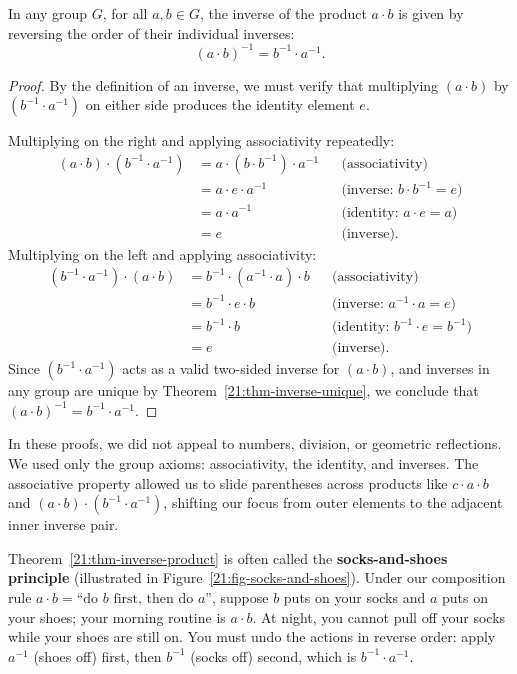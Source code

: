 \begin{theorem}\label{21:thm-inverse-product}
In any group $G$, for all $a, b \in G$, the inverse of the product $a \cdot b$ is given by reversing the order of their individual inverses:
\[
(a \cdot b)^{-1} = b^{-1} \cdot a^{-1}.
\]
\end{theorem}

\begin{proof}
By the definition of an inverse, we must verify that multiplying $(a \cdot b)$ by $(b^{-1} \cdot a^{-1})$ on either side produces the identity element $e$.

Multiplying on the right and applying associativity repeatedly:
\begin{align*}
(a \cdot b) \cdot (b^{-1} \cdot a^{-1}) &= a \cdot (b \cdot b^{-1}) \cdot a^{-1} && \text{(associativity)} \\
&= a \cdot e \cdot a^{-1} && \text{(inverse: $b \cdot b^{-1} = e$)} \\
&= a \cdot a^{-1} && \text{(identity: $a \cdot e = a$)} \\
&= e && \text{(inverse)}.
\end{align*}
Multiplying on the left and applying associativity:
\begin{align*}
(b^{-1} \cdot a^{-1}) \cdot (a \cdot b) &= b^{-1} \cdot (a^{-1} \cdot a) \cdot b && \text{(associativity)} \\
&= b^{-1} \cdot e \cdot b && \text{(inverse: $a^{-1} \cdot a = e$)} \\
&= b^{-1} \cdot b && \text{(identity: $b^{-1} \cdot e = b^{-1}$)} \\
&= e && \text{(inverse)}.
\end{align*}
Since $(b^{-1} \cdot a^{-1})$ acts as a valid two-sided inverse for $(a \cdot b)$, and inverses in any group are unique by Theorem~\ref{21:thm-inverse-unique}, we conclude that $(a \cdot b)^{-1} = b^{-1} \cdot a^{-1}$.
\end{proof}

\begin{intuitionbox}
In these proofs, we did not appeal to numbers, division, or geometric reflections. We used only the group axioms: associativity, the identity, and inverses. The associative property allowed us to slide parentheses across products like $c \cdot a \cdot b$ and $(a \cdot b) \cdot (b^{-1} \cdot a^{-1})$, shifting our focus from outer elements to the adjacent inner inverse pair.

Theorem~\ref{21:thm-inverse-product} is often called the \textbf{socks-and-shoes principle} (illustrated in Figure~\ref{21:fig-socks-and-shoes}). Under our composition rule $a \cdot b = \text{``do } b \text{ first, then do } a\text{''}$, suppose $b$ puts on your socks and $a$ puts on your shoes; your morning routine is $a \cdot b$. At night, you cannot pull off your socks while your shoes are still on. You must undo the actions in reverse order: apply $a^{-1}$ (shoes off) first, then $b^{-1}$ (socks off) second, which is $b^{-1} \cdot a^{-1}$.
\end{intuitionbox}

